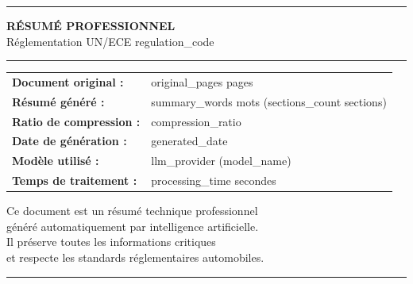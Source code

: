 \documentclass[11pt,a4paper]{article}
\begin{document}
\begin{titlepage}
    \centering
    
    \vspace{2cm}
    
    {\color{regblue}\rule{\linewidth}{2pt}}
    \vspace{0.5cm}
    
    {\Huge\bfseries\color{regblue} RÉSUMÉ PROFESSIONNEL\\[0.5cm]}
    {\LARGE\color{reggray} Réglementation UN/ECE {{regulation_code}}\\[1cm]}
    
    {\color{regblue}\rule{\linewidth}{1pt}}
    \vspace{1cm}
    
    \begin{tabular}{ll}
        \textbf{Document original :} & {{original_pages}} pages \\[0.3cm]
        \textbf{Résumé généré :} & {{summary_words}} mots ({{sections_count}} sections) \\[0.3cm]
        \textbf{Ratio de compression :} & {{compression_ratio}} \\[0.3cm]
        \textbf{Date de génération :} & {{generated_date}} \\[0.3cm]
        \textbf{Modèle utilisé :} & {{llm_provider}} ({{model_name}}) \\[0.3cm]
        \textbf{Temps de traitement :} & {{processing_time}} secondes \\[0.3cm]
    \end{tabular}
    
    \vspace{2cm}
    
    {\large\color{reggray} 
    Ce document est un résumé technique professionnel\\
    généré automatiquement par intelligence artificielle.\\[0.5cm]
    Il préserve toutes les informations critiques\\
    et respecte les standards réglementaires automobiles.
    }
    
    \vfill
    
    {\color{regblue}\rule{\linewidth}{2pt}}
    
\end{titlepage}

\tableofcontents
\newpage
\end{document}
